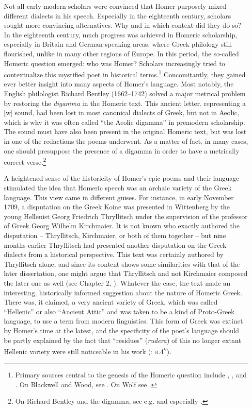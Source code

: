 Not all early modern scholars were convinced that Homer purposely mixed different dialects in his speech. Especially in the eighteenth century, scholars sought more convincing alternatives. Why and in which context did they do so? In the eighteenth century, much progress was achieved in Homeric scholarship, especially in Britain and German-speaking areas, where Greek philology still flourished, unlike in many other regions of Europe. In this period, the so-called Homeric question emerged: who was Homer? Scholars increasingly tried to contextualize this mystified poet in historical terms.\footnote{Primary sources central to the genesis of the Homeric question include \citet[]{[blackwell]1735}, \citet{Wood1775}, and \citet{Wolf1795}. On Blackwell and Wood, see \citet[90--108]{Bauman2003}. On Wolf see \citet[\textsc{iii.}55–57]{Sandys1908}.} Concomitantly, they gained ever better insight into many aspects of Homer’s language. Most notably, the English philologist Richard Bentley (1662–1742) solved a major metrical problem by restoring the \textit{digamma} in the Homeric text. This ancient letter, representing a [w] sound, had been lost in most canonical dialects of Greek, but not in Aeolic, which is why it was often called “the Aeolic digamma” in premodern scholarship. The sound must have also been present in the original Homeric text, but was lost in one of the redactions the poems underwent. As a matter of fact, in many cases, one should presuppose the presence of a digamma in order to have a metrically correct verse.\footnote{On Richard Bentley and the digamma, see e.g. \citet[\textsc{ii.}407]{Sandys1908} and especially \citet[182--186]{Haugen2011}.}

A heightened sense of the historicity of Homer’s epic poems and their language stimulated the idea that Homeric speech was an archaic variety of the Greek language. This view came in different guises. For instance, in early November 1709, a disputation on the Greek Koine was presented in Wittenberg by the young Hellenist Georg Friedrich Thryllitsch under the supervision of the professor of Greek Georg Wilhelm Kirchmaier. It is not known who exactly authored the disputation – Thryllitsch, Kirchmaier, or both of them together – but nine months earlier Thryllitsch had presented another disputation on the Greek dialects from a historical perspective. This text was certainly authored by Thryllitsch alone, and since its content shows some similarities with that of the later dissertation, one might argue that Thryllitsch and not Kirchmaier composed the later one as well (see Chapter 2, ). Whatever the case, the text made an interesting, historically informed suggestion about the nature of Homeric Greek. There was, it claimed, a very ancient variety of Greek, which was called “Hellenic” or also “Ancient Attic” and was taken to be a kind of Proto-Greek language, to use a term from modern linguistics. This form of Greek was extinct by Homer’s time at the latest, and the specificity of the poet’s language should be partly explained by the fact that “residues” (\textit{rudera}) of this no longer extant Hellenic variety were still noticeable in his work (\citealt{Kirchmaier1709}: \textsc{b.4}\textsc{\textsuperscript{v}}).

